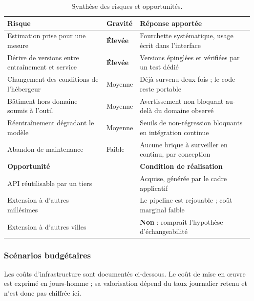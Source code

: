 \begin{table}[H]
\centering
\small
\begin{tabularx}{\linewidth}{@{}L{4.4cm}L{1.6cm}X@{}}
\toprule
\textbf{Risque} & \textbf{Gravité} & \textbf{Réponse apportée} \\
\midrule
Estimation prise pour une mesure & \textbf{Élevée} & Fourchette systématique, usage écrit dans l'interface \\
Dérive de versions entre entraînement et service & \textbf{Élevée} & Versions épinglées et vérifiées par un test dédié \\
Changement des conditions de l'hébergeur & Moyenne & Déjà survenu deux fois ; le code reste portable \\
Bâtiment hors domaine soumis à l'outil & Moyenne & Avertissement non bloquant au-delà du domaine observé \\
Réentraînement dégradant le modèle & Moyenne & Seuils de non-régression bloquants en intégration continue \\
Abandon de maintenance & Faible & Aucune brique à surveiller en continu, par conception \\
\midrule
\textbf{Opportunité} & & \textbf{Condition de réalisation} \\
\midrule
API réutilisable par un tiers & & Acquise, générée par le cadre applicatif \\
Extension à d'autres millésimes & & Le pipeline est rejouable ; coût marginal faible \\
Extension à d'autres villes & & \textbf{Non} : romprait l'hypothèse d'échangeabilité \\
\bottomrule
\end{tabularx}
\caption{Synthèse des risques et opportunités.}
\end{table}

\subsubsection*{Scénarios budgétaires}

Les coûts d'infrastructure sont documentés ci-dessous. Le coût de mise en œuvre
est exprimé en jours-homme ; sa valorisation dépend du taux journalier retenu et
n'est donc pas chiffrée ici.

